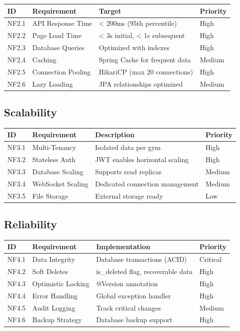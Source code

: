 \documentclass[
  12pt,
  a4paperpaper,
]{report}
\newcounter{none} %
\begin{document}
{\def\LTcaptype{none} %
\begin{longtable}[]{@{}llll@{}}
\hline
ID & Requirement & Target & Priority \\
\hline
\endhead
\hline
\endlastfoot
NF2.1 & API Response Time & \textless{} 200ms (95th percentile) &
High \\
NF2.2 & Page Load Time & \textless{} 3s initial, \textless{} 1s
subsequent & High \\
NF2.3 & Database Queries & Optimized with indexes & High \\
NF2.4 & Caching & Spring Cache for frequent data & Medium \\
NF2.5 & Connection Pooling & HikariCP (max 20 connections) & High \\
NF2.6 & Lazy Loading & JPA relationships optimized & Medium \\
\end{longtable}
}

\subsection{Scalability}\label{scalability}

{\def\LTcaptype{none} %
\begin{longtable}[]{@{}llll@{}}
\hline
ID & Requirement & Description & Priority \\
\hline
\endhead
\hline
\endlastfoot
NF3.1 & Multi-Tenancy & Isolated data per gym & High \\
NF3.2 & Stateless Auth & JWT enables horizontal scaling & High \\
NF3.3 & Database Scaling & Supports read replicas & Medium \\
NF3.4 & WebSocket Scaling & Dedicated connection management & Medium \\
NF3.5 & File Storage & External storage ready & Low \\
\end{longtable}
}


\subsection{Reliability}\label{reliability}

{\def\LTcaptype{none} %
\begin{longtable}[]{@{}llll@{}}
\hline
ID & Requirement & Implementation & Priority \\
\hline
\endhead
\hline
\endlastfoot
NF4.1 & Data Integrity & Database transactions (ACID) & Critical \\
NF4.2 & Soft Deletes & is\_deleted flag, recoverable data & High \\
NF4.3 & Optimistic Locking & @Version annotation & High \\
NF4.4 & Error Handling & Global exception handler & High \\
NF4.5 & Audit Logging & Track critical changes & Medium \\
NF4.6 & Backup Strategy & Database backup support & High \\
\end{longtable}
}
\end{document}
